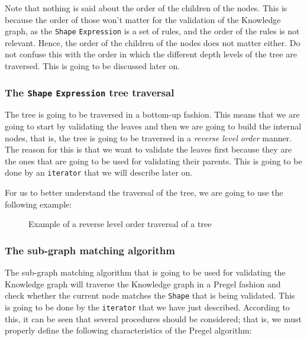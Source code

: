Note that nothing is said about the order of the children of the nodes. This is because the order of those won't matter for the validation of the Knowledge graph, as the \texttt{Shape} \texttt{Expression} is a set of rules, and the order of the rules is not relevant. Hence, the order of the children of the nodes does not matter either. Do not confuse this with the order in which the different depth levels of the tree are traversed. This is going to be discussed later on.

\subsubsection{The \texttt{Shape} \texttt{Expression} tree traversal}

The tree is going to be traversed in a bottom-up fashion. This means that we are going to start by validating the leaves and then we are going to build the internal nodes, that is, the tree is going to be traversed in a \textit{reverse level order} manner. The reason for this is that we want to validate the leaves first because they are the ones that are going to be used for validating their parents. This is going to be done by an \texttt{iterator} that we will describe later on.

For us to better understand the traversal of the tree, we are going to use the following example:

\begin{example}
    \begin{figure}[ht]
        \centering
        
        \caption{Example of a reverse level order traversal of a tree}
        \label{fig:tree_traversal}
    \end{figure}
\end{example}

\subsubsection{The sub-graph matching algorithm}

The sub-graph matching algorithm that is going to be used for validating the Knowledge graph will traverse the Knowledge graph in a Pregel fashion and check whether the current node matches the \texttt{Shape} that is being validated. This is going to be done by the \texttt{iterator} that we have just described. According to this, it can be seen that several procedures should be considered; that is, we must properly define the following characteristics of the Pregel algorithm:

